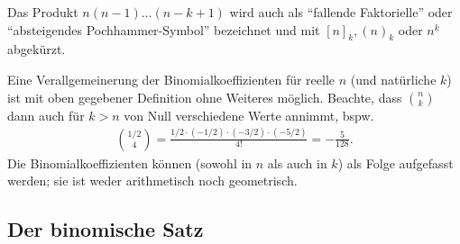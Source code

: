 Das Produkt $n(n-1)\hdots(n-k+1)$ wird auch als ``fallende Faktorielle'' oder ``absteigendes Pochhammer-Symbol'' bezeichnet und mit $[n]_k, (n)_k$ oder $n^{\underline{k}}$ abgekürzt.

Eine Verallgemeinerung der Binomialkoeffizienten für reelle $n$ (und natürliche $k$) ist mit oben gegebener Definition ohne Weiteres möglich. Beachte, dass $\binom{n}{k}$ dann auch für $k>n$ von Null verschiedene Werte annimmt, bspw. 
\begin{align}
    \binom{1/2}{4} = \frac{1/2\cdot (-1/2)\cdot (-3/2) \cdot (-5/2)}{4!} = -\frac{5}{128}. 
\end{align}
Die Binomialkoeffizienten können (sowohl in $n$ als auch in $k$) als Folge aufgefasst werden; sie ist weder arithmetisch noch geometrisch. 

\newpage
\subsection{Der binomische Satz}

